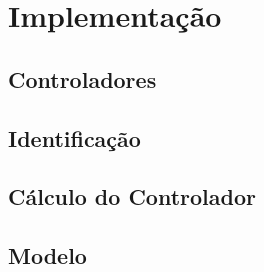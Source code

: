 %

\chapter{Implementação}

\section{Controladores}

\section{Identificação}

\section{Cálculo do Controlador}

\section{Modelo}

%


